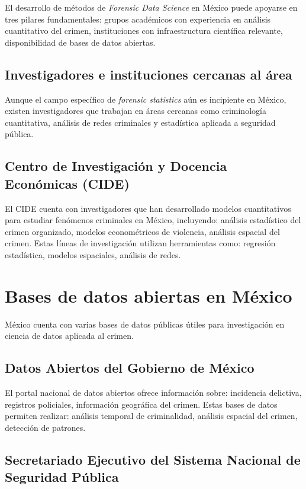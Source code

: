 \documentclass[a4paper,10pt,oneside]{article}
\begin{document}
El desarrollo de m\'etodos de \textit{Forensic Data Science} en M\'exico puede apoyarse en tres pilares fundamentales: grupos acad\'emicos con experiencia en an\'alisis cuantitativo del crimen, instituciones con infraestructura cient\'ifica relevante, disponibilidad de bases de datos abiertas.

\subsection{Investigadores e instituciones cercanas al \'area}

Aunque el campo espec\'ifico de \textit{forensic statistics} a\'un es incipiente en M\'exico, existen investigadores que trabajan en \'areas cercanas como criminolog\'ia cuantitativa, an\'alisis de redes criminales y estad\'istica aplicada a seguridad p\'ublica.

\subsection{Centro de Investigaci\'on y Docencia Econ\'omicas (CIDE)}

El CIDE cuenta con investigadores que han desarrollado modelos cuantitativos para estudiar fen\'omenos criminales en M\'exico, incluyendo: an\'alisis estad\'istico del crimen organizado, modelos econom\'etricos de violencia, an\'alisis espacial del crimen. Estas l\'ineas de investigaci\'on utilizan herramientas como: regresi\'on estad\'istica, modelos espaciales, an\'alisis de redes.


\section{Bases de datos abiertas en M\'exico}

M\'exico cuenta con varias bases de datos p\'ublicas \'utiles para investigaci\'on en ciencia de datos aplicada al crimen.

\subsection{Datos Abiertos del Gobierno de M\'exico}

El portal nacional de datos abiertos ofrece informaci\'on sobre: incidencia delictiva, registros policiales, informaci\'on geogr\'afica del crimen. Estas bases de datos permiten realizar: an\'alisis temporal de criminalidad, an\'alisis espacial del crimen, detecci\'on de patrones.

\subsection{Secretariado Ejecutivo del Sistema Nacional de Seguridad P\'ublica}
\end{document}
